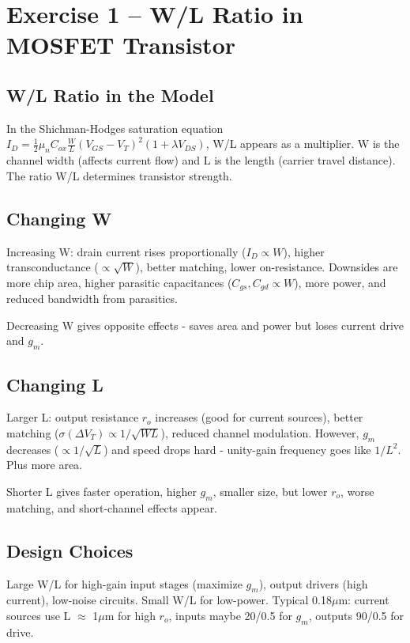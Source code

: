 \documentclass[main.tex]{subfiles}
\begin{document}
\section{Exercise 1 – W/L Ratio in MOSFET Transistor}

\subsection*{W/L Ratio in the Model}
In the Shichman-Hodges saturation equation $I_D = \frac{1}{2} \mu_n C_{ox} \frac{W}{L} (V_{GS} - V_T)^2 (1 + \lambda V_{DS})$, W/L appears as a multiplier. W is the channel width (affects current flow) and L is the length (carrier travel distance). The ratio W/L determines transistor strength.

\subsection*{Changing W}
Increasing W: drain current rises proportionally ($I_D \propto W$), higher transconductance ($\propto \sqrt{W}$), better matching, lower on-resistance. Downsides are more chip area, higher parasitic capacitances ($C_{gs}, C_{gd} \propto W$), more power, and reduced bandwidth from parasitics.

Decreasing W gives opposite effects - saves area and power but loses current drive and $g_m$.

\subsection*{Changing L}
Larger L: output resistance $r_o$ increases (good for current sources), better matching ($\sigma(\Delta V_T) \propto 1/\sqrt{WL}$), reduced channel modulation. However, $g_m$ decreases ($\propto 1/\sqrt{L}$) and speed drops hard - unity-gain frequency goes like $1/L^2$. Plus more area.

Shorter L gives faster operation, higher $g_m$, smaller size, but lower $r_o$, worse matching, and short-channel effects appear.

\subsection*{Design Choices}
Large W/L for high-gain input stages (maximize $g_m$), output drivers (high current), low-noise circuits. Small W/L for low-power. Typical 0.18$\mu$m: current sources use L $\approx$ 1$\mu$m for high $r_o$, inputs maybe 20/0.5 for $g_m$, outputs 90/0.5 for drive.
\end{document}
